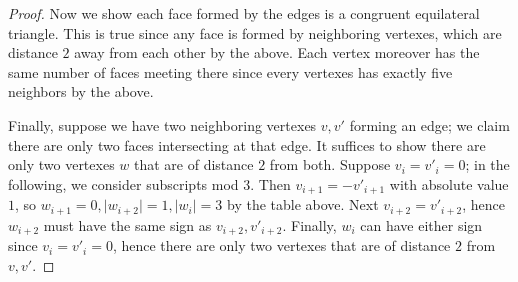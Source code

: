 \documentclass[12pt]{article}
\theoremstyle{remark}
\begin{document}
\begin{proof}
  \par Now we show each face formed by the edges is a congruent equilateral triangle. This is true since any face is formed by neighboring vertexes, which are distance $2$ away from each other by the above. Each vertex moreover has the same number of faces meeting there since every vertexes has exactly five neighbors by the above.
  \par Finally, suppose we have two neighboring vertexes $v,v'$ forming an edge; we claim there are only two faces intersecting at that edge. It suffices to show there are only two vertexes $w$ that are of distance $2$ from both. Suppose $v_i = v'_i = 0$; in the following, we consider subscripts mod $3$. Then $v_{i+1} = -v'_{i+1}$ with absolute value $1$, so $w_{i+1} = 0,\lvert w_{i+2} \rvert = 1,\lvert w_i \rvert = 3$ by the table above. Next $v_{i+2} = v'_{i+2}$, hence $w_{i+2}$ must have the same sign as $v_{i+2},v'_{i+2}$. Finally, $w_i$ can have either sign since $v_i = v'_i = 0$, hence there are only two vertexes that are of distance $2$ from $v,v'$.
\end{proof}

\begingroup
\renewcommand{\thesubsection}{\thesection.\Alph{subsection}}
\setcounter{subsection}{12}
\end{document}
